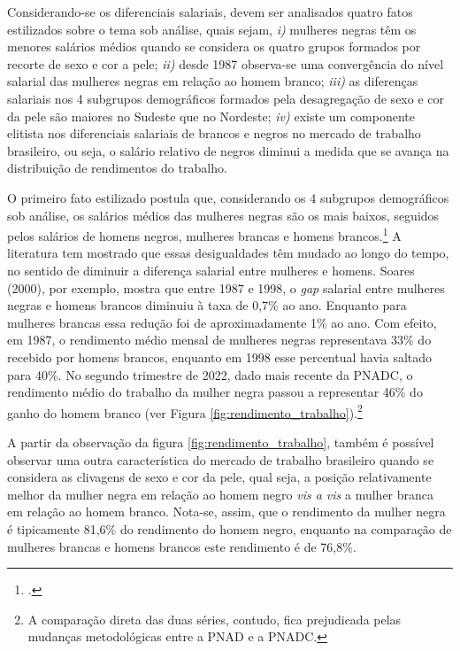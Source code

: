 \documentclass[12pt]{article}
\begin{document}
\par Considerando-se os diferenciais salariais, devem ser analisados quatro fatos estilizados sobre o tema sob análise, quais sejam, \textit{i)} mulheres negras têm os menores salários médios quando se considera os quatro grupos formados por recorte de sexo e cor a pele; \textit{ii)} desde 1987 observa-se uma convergência do nível salarial das mulheres negras em relação ao homem branco; \textit{iii)} as diferenças salariais nos 4 subgrupos de\-mo\-grá\-fi\-cos formados pela desagregação de sexo e cor da pele são maiores no Sudeste que no Nordeste; \textit{iv)} existe um componente elitista nos diferenciais salariais de brancos e negros no mercado de trabalho brasileiro, ou seja, o salário relativo de negros diminui a medida que se avança na distribuição de rendimentos do trabalho.

\par O primeiro fato estilizado postula que, considerando os 4 subgrupos de\-mo\-grá\-fi\-cos sob análise, os salários médios das mulheres negras são os mais baixos, seguidos pelos salários de homens negros, mulheres brancas e homens brancos.\footcite{soares2000perfil,campante2004desigualdade} A literatura tem mostrado que essas desigualdades têm mudado ao longo do tempo, no sentido de diminuir a diferença salarial entre mulheres e homens. Soares (2000), por exemplo, mostra que entre 1987 e 1998, o \textit{gap} salarial entre mulheres negras e homens brancos diminuiu à taxa de 0,7\% ao ano. Enquanto para mulheres brancas essa redução foi de aproximadamente 1\% ao ano. Com efeito, em 1987, o rendimento médio mensal de mulheres negras representava 33\% do recebido por homens brancos, enquanto em 1998 esse percentual havia saltado para 40\%. No segundo trimestre de 2022, dado mais recente da PNADC, o rendimento médio do trabalho da mulher negra passou a representar 46\% do ganho do homem branco (ver Figura \ref{fig:rendimento_trabalho}).\footnote{A comparação direta das duas séries, contudo, fica prejudicada pelas mudanças metodológicas entre a PNAD e a PNADC.}

\par A partir da observação da figura \ref{fig:rendimento_trabalho}, também é possível observar uma outra característica do mercado de trabalho brasileiro quando se considera as clivagens de sexo e cor da pele, qual seja, a posição relativamente melhor da mulher negra em relação ao homem negro \textit{vis a vis} a mulher branca em relação ao homem branco. Nota-se, assim, que o rendimento da mulher negra é tipicamente 81,6\% do rendimento do homem negro, enquanto na comparação de mulheres brancas e homens brancos este rendimento é de 76,8\%.
\end{document}
